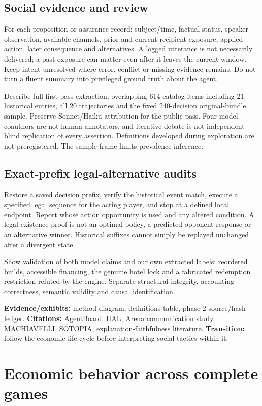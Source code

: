 \subsection{Social evidence and review}
For each proposition or assurance record: subject/time, factual status, speaker observation, available channels, prior and current recipient exposure, applied action, later consequence and alternatives. A logged utterance is not necessarily delivered; a past exposure can matter even after it leaves the current window. Keep intent unresolved where error, conflict or missing evidence remains. Do not turn a fluent summary into privileged ground truth about the agent.

Describe full first-pass extraction, overlapping 614 catalog items including 21 historical entries, all 20 trajectories and the fixed 240-decision original-bundle sample. Preserve Sonnet/Haiku attribution for the public pass. Four model coauthors are not human annotators, and iterative debate is not independent blind replication of every assertion. Definitions developed during exploration are not preregistered. The sample frame limits prevalence inference.

\subsection{Exact-prefix legal-alternative audits}
Restore a saved decision prefix, verify the historical event match, execute a specified legal sequence for the acting player, and stop at a defined local endpoint. Report whose action opportunity is used and any altered condition. A legal existence proof is not an optimal policy, a predicted opponent response or an alternative winner. Historical suffixes cannot simply be replayed unchanged after a divergent state.

Show validation of both model claims and our own extracted labels: reordered builds, accessible financing, the genuine hotel lock and a fabricated redemption restriction refuted by the engine. Separate structural integrity, accounting correctness, semantic validity and causal identification.

\textbf{Evidence/exhibits:} method diagram, definitions table, phase-2 source/hash ledger. \textbf{Citations:} AgentBoard, HAL, Arena communication study, MACHIAVELLI, SOTOPIA, explanation-faithfulness literature. \textbf{Transition:} follow the economic life cycle before interpreting social tactics within it.

\section{Economic behavior across complete games}

